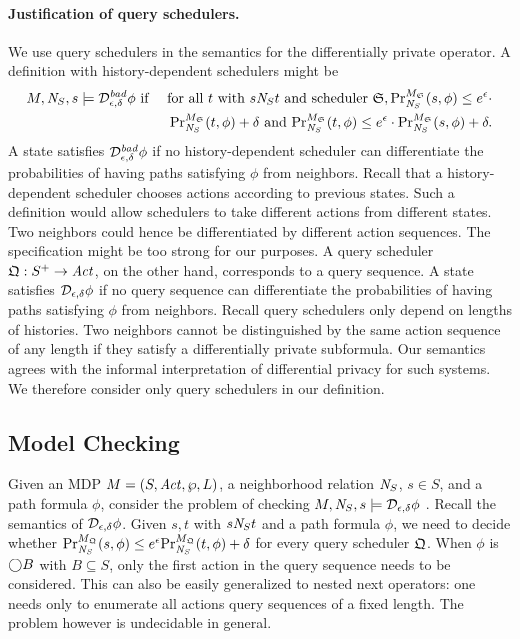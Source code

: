 \noindent
\paragraph{Justification of query schedulers.}
We use query schedulers in the semantics for the differentially
private operator. A definition with history-dependent schedulers
might be
\begin{eqnarray*}
  M, \neighbor{S}, s \models \dpriv{\epsilon}{\delta}^{\mathit{bad}} \phi
  & \textmd{ if } &
  \textmd{for all } t \textmd{ with } s \neighbor{S} t \textmd{ and
  scheduler } \scheduler{S},
  \myPr{s}{M_{\scheduler{S}}}{\neighbor{S}}{\phi} \leq
  e^{\epsilon} \cdot\\
  && \myPr{t}{M_{\scheduler{S}}}{\neighbor{S}}{\phi} + \delta \textmd{ and }
  \myPr{t}{M_{\scheduler{S}}}{\neighbor{S}}{\phi} \leq
  e^{\epsilon} \cdot \myPr{s}{M_{\scheduler{S}}}{\neighbor{S}}{\phi}
  + \delta.
\end{eqnarray*}
A state satisfies $\dpriv{\epsilon}{\delta}^{\mathit{bad}} \phi$ if
no history-dependent scheduler can differentiate the probabilities
of having paths satisfying
$\phi$ from neighbors. Recall that a history-dependent scheduler chooses
actions according to previous states. Such a definition would allow
schedulers to take different actions from different states. 
Two neighbors could hence be differentiated by different action sequences.
The specification might be too strong for our purposes.
A query scheduler $\scheduler{Q} : S^+ \rightarrow \Act$,
on the other hand, corresponds to a query sequence. A state satisfies
$\dpriv{\epsilon}{\delta} \phi$ if no query sequence can differentiate
the probabilities of having paths satisfying $\phi$ from neighbors.
Recall query schedulers only depend on lengths of histories. Two
neighbors cannot be distinguished by the same action sequence of any
length if they satisfy a differentially private subformula.
Our semantics agrees with the informal interpretation of differential
privacy for such systems. We therefore consider only query schedulers
in our definition.

\subsection{Model Checking}
Given an MDP $M =
(S, \Act, \wp, L)$, a neighborhood relation $\neighbor{S}$, $s \in
S$, and a path formula $\phi$, consider the problem of checking $M,
\neighbor{S}, s \models 
\dpriv{\epsilon}{\delta} \phi$ . Recall the semantics of $\dpriv{\epsilon}{\delta}
\phi$. Given $s, t$ with $s \neighbor{S} t$ and a path formula
$\phi$, we need to decide whether
$\myPr{s}{M_{\scheduler{Q}}}{\neighbor{S}}{\phi} \leq
e^{\epsilon} \myPr{t}{M_{\scheduler{Q}}}{\neighbor{S}}{\phi} + \delta$
for every query scheduler $\scheduler{Q}$.
When $\phi$ is $\gX B$ with $B\subseteq S$, only the first action in
the query sequence needs to be considered. This can also be easily generalized to nested next operators:  one needs only to enumerate
all actions query sequences of a fixed length.
The problem however is undecidable in general.

